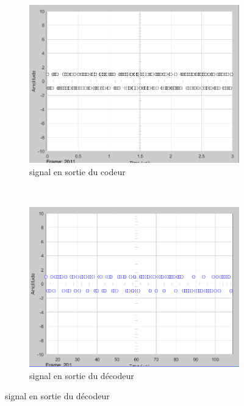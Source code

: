 \documentclass{report}
\begin{document}
\begin{figure}
	\centering
	\begin{subfigure}[b]{0.4\textwidth}
		\includegraphics[width=\textwidth]{temporel_q1_codificada}
			\caption{signal en sortie du codeur}
		\label{fig:temporelq1codificada}
	\end{subfigure}
	~ %
	\begin{subfigure}[b]{0.4\textwidth}
		\includegraphics[width=\textwidth]{temporel_q1_decodificada}
			\caption{signal en sortie du décodeur}
		\label{fig:temporelq1decodificada}
	\end{subfigure}
\end{figure}
\end{document}
